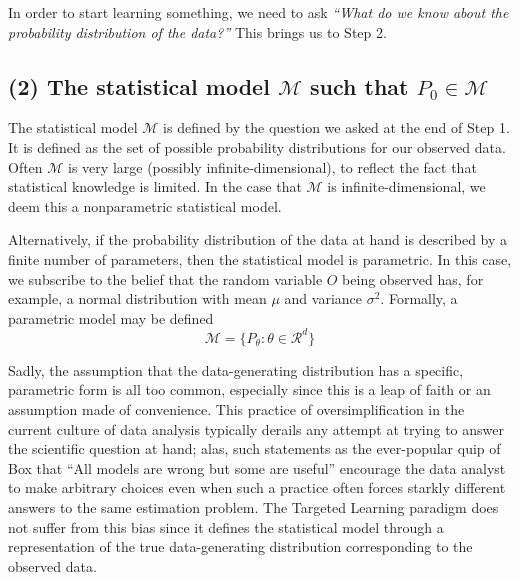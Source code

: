 \documentclass[
  12pt, krantz2,
]{book}
\theoremstyle{definition}
\theoremstyle{definition}
\theoremstyle{definition}
\newcommand{\1}{\mathbbm{1}}
\begin{document}
In order to start learning something, we need to ask \emph{``What do we know about the
probability distribution of the data?''} This brings us to Step 2.

\hypertarget{the-statistical-model-mathcalm-such-that-p_0-in-mathcalm}{%
\subsection*{\texorpdfstring{(2) The statistical model \(\mathcal{M}\) such that \(P_0 \in \mathcal{M}\)}{(2) The statistical model \textbackslash mathcal\{M\} such that P\_0 \textbackslash in \textbackslash mathcal\{M\}}}\label{the-statistical-model-mathcalm-such-that-p_0-in-mathcalm}}


The statistical model \(\mathcal{M}\) is defined by the question we asked at the
end of Step 1. It is defined as the set of possible probability
distributions for our observed data. Often \(\mathcal{M}\) is very large (possibly
infinite-dimensional), to reflect the fact that statistical knowledge is
limited. In the case that \(\mathcal{M}\) is infinite-dimensional, we deem this a
nonparametric statistical model.

Alternatively, if the probability distribution of the data at hand is described
by a finite number of parameters, then the statistical model is parametric. In
this case, we subscribe to the belief that the random variable \(O\) being
observed has, for example, a normal distribution with mean \(\mu\) and variance
\(\sigma^2\). Formally, a parametric model may be defined
\begin{equation*}
  \mathcal{M} = \{P_{\theta} : \theta \in \mathcal{R}^d \}
\end{equation*}

Sadly, the assumption that the data-generating distribution has a specific,
parametric form is all too common, especially since this is a leap of faith or
an assumption made of convenience. This practice of oversimplification in the
current culture of data analysis typically derails any attempt at trying to
answer the scientific question at hand; alas, such statements as the
ever-popular quip of Box that ``All models are wrong but some are useful''
encourage the data analyst to make arbitrary choices even when such a practice
often forces starkly different answers to the same estimation problem. The
Targeted Learning paradigm does not suffer from this bias since it defines the
statistical model through a representation of the true data-generating
distribution corresponding to the observed data.
\end{document}
